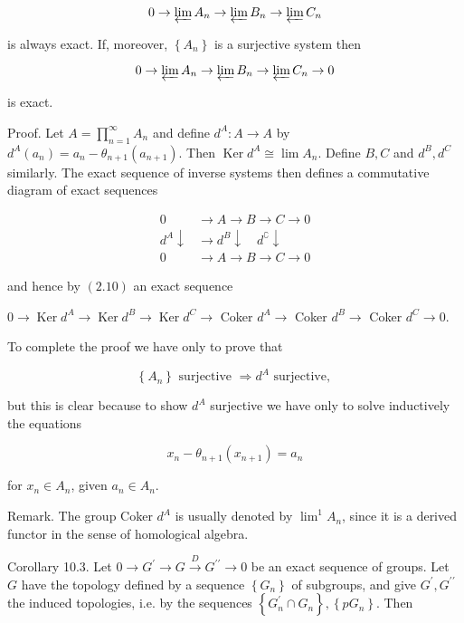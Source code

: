 \documentclass{standalone}
\theoremstyle{definition}
\theoremstyle{remark}
\begin{document}
\[
0 \rightarrow \varprojlim A_{n} \rightarrow \varprojlim B_{n} \rightarrow \varprojlim C_{n}
\]

is always exact. If, moreover, $\left\{A_{n}\right\}$ is a surjective system then

\[
0 \rightarrow \varprojlim A_{n} \rightarrow \varprojlim B_{n} \rightarrow \varprojlim  C_{n} \rightarrow 0
\]

is exact.

Proof. Let $A=\prod_{n=1}^{\infty} A_{n}$ and define $d^{A}: A \rightarrow A$ by $d^{A}\left(a_{n}\right)=a_{n}-\theta_{n+1}\left(a_{n+1}\right)$. Then $\operatorname{Ker} d^{A} \cong \lim A_{n}$. Define $B, C$ and $d^{B}, d^{C}$ similarly. The exact sequence of inverse systems then defines a commutative diagram of exact sequences

\[
\begin{aligned}
0 & \rightarrow A \rightarrow B \rightarrow C \rightarrow 0 \\
d^{A} \downarrow & \rightarrow d^{B} \downarrow \quad d^{\complement} \downarrow \\
0 & \rightarrow A \rightarrow B \rightarrow C \rightarrow 0
\end{aligned}
\]

and hence by $(2.10)$ an exact sequence

$0 \rightarrow \operatorname{Ker} d^{A} \rightarrow \operatorname{Ker} d^{B} \rightarrow \operatorname{Ker} d^{C} \rightarrow$ Coker $d^{A} \rightarrow$ Coker $d^{B} \rightarrow$ Coker $d^{C} \rightarrow 0$.

To complete the proof we have only to prove that

\[
\left\{A_{n}\right\} \text { surjective } \Rightarrow d^{A} \text { surjective, }
\]

but this is clear because to show $d^{A}$ surjective we have only to solve inductively the equations

\[
x_{n}-\theta_{n+1}\left(x_{n+1}\right)=a_{n}
\]

for $x_{n} \in A_{n}$, given $a_{n} \in A_{n}$.

Remark. The group Coker $d^{A}$ is usually denoted by $\lim ^{1} A_{n}$, since it is a derived functor in the sense of homological algebra.

Corollary 10.3. Let $0 \rightarrow G^{\prime} \rightarrow G \stackrel{D}{\rightarrow} G^{\prime \prime} \rightarrow 0$ be an exact sequence of groups. Let $G$ have the topology defined by a sequence $\left\{G_{n}\right\}$ of subgroups, and give $G^{\prime}, G^{\prime \prime}$ the induced topologies, i.e. by the sequences $\left\{G_{n}^{\prime} \cap G_{n}\right\},\left\{p G_{n}\right\}$. Then
\end{document}
